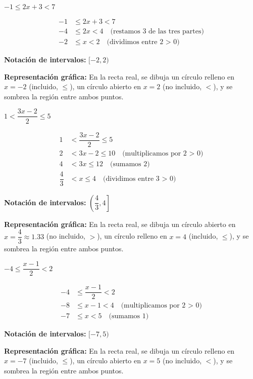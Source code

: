 \begin{exercise}
\problem $-1 \le 2x + 3 < 7$

\begin{solucion}
\begin{align*}
-1 &\le 2x + 3 < 7 \\
-4 &\le 2x < 4 \quad \text{(restamos 3 de las tres partes)} \\
-2 &\le x < 2 \quad \text{(dividimos entre 2 > 0)}
\end{align*}

\textbf{Notación de intervalos:} $[-2, 2)$

\textbf{Representación gráfica:} En la recta real, se dibuja un círculo relleno en $x = -2$ (incluido, $\le$), un círculo abierto en $x = 2$ (no incluido, $<$), y se sombrea la región entre ambos puntos.
\end{solucion}

\problem $1 < \dfrac{3x - 2}{2} \le 5$

\begin{solucion}
\begin{align*}
1 &< \dfrac{3x - 2}{2} \le 5 \\
2 &< 3x - 2 \le 10 \quad \text{(multiplicamos por 2 > 0)} \\
4 &< 3x \le 12 \quad \text{(sumamos 2)} \\
\dfrac{4}{3} &< x \le 4 \quad \text{(dividimos entre 3 > 0)}
\end{align*}

\textbf{Notación de intervalos:} $\left(\dfrac{4}{3}, 4\right]$

\textbf{Representación gráfica:} En la recta real, se dibuja un círculo abierto en $x = \dfrac{4}{3} \approx 1.33$ (no incluido, $>$), un círculo relleno en $x = 4$ (incluido, $\le$), y se sombrea la región entre ambos puntos.
\end{solucion}

\problem $-4 \le \dfrac{x - 1}{2} < 2$

\begin{solucion}
\begin{align*}
-4 &\le \dfrac{x - 1}{2} < 2 \\
-8 &\le x - 1 < 4 \quad \text{(multiplicamos por 2 > 0)} \\
-7 &\le x < 5 \quad \text{(sumamos 1)}
\end{align*}

\textbf{Notación de intervalos:} $[-7, 5)$

\textbf{Representación gráfica:} En la recta real, se dibuja un círculo relleno en $x = -7$ (incluido, $\le$), un círculo abierto en $x = 5$ (no incluido, $<$), y se sombrea la región entre ambos puntos.
\end{solucion}


\end{exercise}
